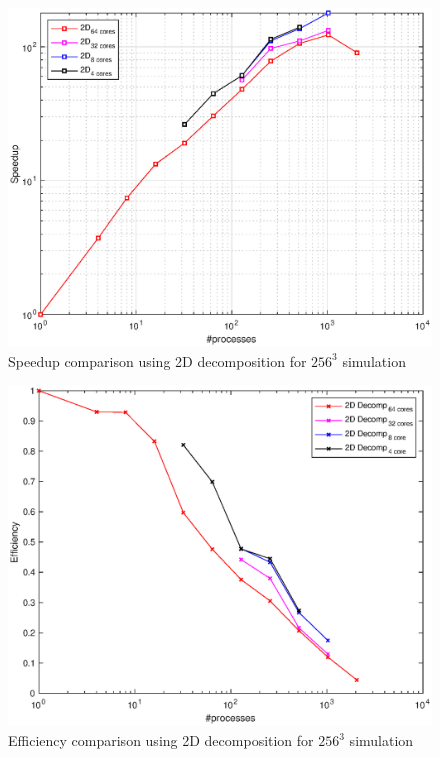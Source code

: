 \begin{figure}
\begin{center}
\includegraphics[scale=0.6]{grafici/1287}
\caption{Speedup comparison using 2D decomposition for $256^{3}$ simulation}
\label{1287}
\end{center}
\end{figure}

\begin{figure}
\begin{center}
\includegraphics[scale=0.6]{grafici/1289}
\caption{Efficiency comparison using 2D decomposition for $256^{3}$ simulation}
\label{1289}
\end{center}
\end{figure}

